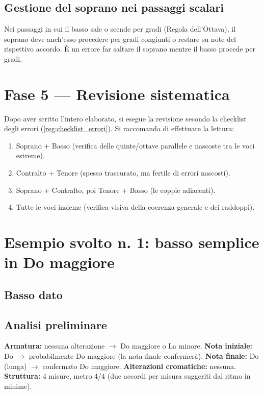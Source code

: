 \subsection{Gestione del soprano nei passaggi scalari}

Nei passaggi in cui il basso sale o scende per gradi (Regola dell'Ottava), il soprano deve anch'esso procedere per gradi congiunti o restare su note del rispettivo accordo. È un errore far saltare il soprano mentre il basso procede per gradi.

\section{Fase 5 — Revisione sistematica}
\label{sec:fase5_basso}

Dopo aver scritto l'intero elaborato, si esegue la revisione secondo la checklist degli errori (\ref{reg:checklist_errori}). Si raccomanda di effettuare la lettura:
\begin{enumerate}
	\item Soprano + Basso (verifica delle quinte/ottave parallele e nascoste tra le voci estreme).
	\item Contralto + Tenore (spesso trascurato, ma fertile di errori nascosti).
	\item Soprano + Contralto, poi Tenore + Basso (le coppie adiacenti).
	\item Tutte le voci insieme (verifica visiva della coerenza generale e dei raddoppi).
\end{enumerate}

\section{Esempio svolto n. 1: basso semplice in Do maggiore}
\label{sec:esempio1}

\subsection{Basso dato}

\subsection{Analisi preliminare}

\textbf{Armatura:} nessuna alterazione $\rightarrow$ Do maggiore o La minore.
\textbf{Nota iniziale:} Do $\rightarrow$ probabilmente Do maggiore (la nota finale confermerà).
\textbf{Nota finale:} Do (lunga) $\rightarrow$ confermato Do maggiore.
\textbf{Alterazioni cromatiche:} nessuna.
\textbf{Struttura:} 4 misure, metro 4/4 (due accordi per misura suggeriti dal ritmo in minime).

